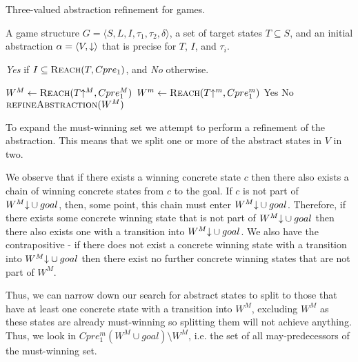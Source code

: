 \begin{algorithm}
\caption{Three-valued abstraction refinement for games.}
\label{alg:generic}

\begin{algorithmic}[1]

     A game structure $G = \langle S, L, I, \tau_1, \tau_2, \delta \rangle$, a set 
    of target states $T\subseteq S$, and an initial abstraction $\alpha=\langle V, \mathord{\downarrow} \rangle$
    that is precise for $T$, $I$, and $\tau_i$.

     {\it Yes} if $I \subseteq \textsc{Reach}(T, Cpre_1)$, and {\it No} otherwise.

    \Loop
        \State $W^M \gets \textsc{Reach}(T\mathord{\uparrow^M}, Cpre_1^M)$
        \State $W^m \gets \textsc{Reach}(T\mathord{\uparrow^m}, Cpre_1^m)$
         \label{alg:tvg:tc1}
            \State\Return Yes
         \label{alg:tvg:tc2}
            \State\Return No
        \Else       
            \State$\Call{refineAbstraction}{W^M}$
        \EndIf
    \EndLoop
\end{algorithmic}
\end{algorithm}

To expand the must-winning set we attempt to perform a refinement of the abstraction. This means that we split one or more of the abstract states in $V$ in two. 

We observe that if there exists a winning concrete state $c$ then there also exists a chain of winning concrete states from $c$ to the goal. If $c$ is not part of $W^M\mathord{\downarrow} \cup goal$, then, some point, this chain must enter $W^M\mathord{\downarrow} \cup goal$. Therefore, if there exists some concrete winning state that is not part of $W^M\mathord{\downarrow} \cup goal$ then there also exists one with a transition into $W^M\mathord{\downarrow} \cup goal$. We also have the contrapositive - if there does not exist a concrete winning state with a transition into $W^M\mathord{\downarrow} \cup goal$ then there exist no further concrete winning states that are not part of $W^M$. 

Thus, we can narrow down our search for abstract states to split to those that have at least one concrete state with a transition into $W^M$, excluding $W^M$ as these states are already must-winning so splitting them will not achieve anything. Thus, we look in $Cpre_1^m(W^M \cup goal)\setminus W^M$, i.e. the set of all may-predecessors of the must-winning set. 

